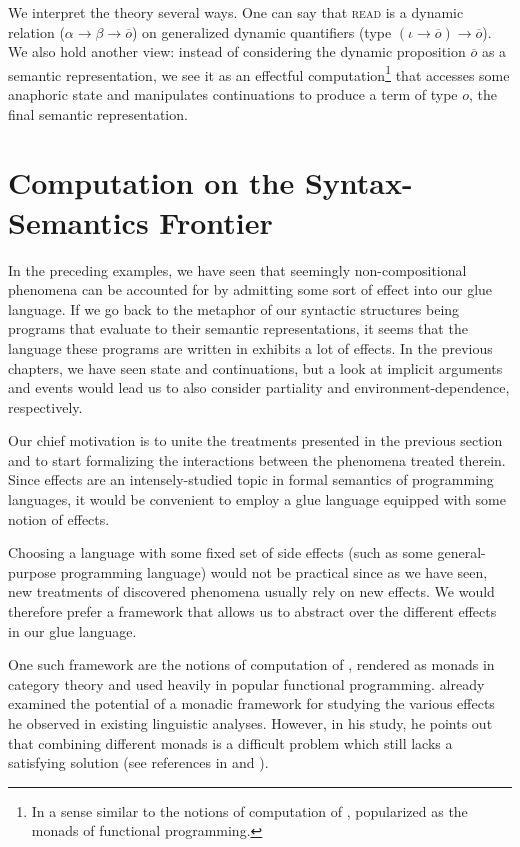 \documentclass{article}
\begin{document}
We interpret the theory several ways. One can say that \textsc{read} is a
dynamic relation ($\alpha \to \beta \to \overline{o}$) on generalized dynamic
quantifiers (type $(\iota \to \overline{o}) \to \overline{o}$). We also hold
another view: instead of considering the dynamic proposition $\overline{o}$ as
a semantic representation, we see it as an effectful computation\footnote{In a
  sense similar to the notions of computation of \citet{moggi1991notions},
  popularized as the monads of functional programming.} that accesses some
anaphoric state and manipulates continuations to produce a term of type $o$,
the final semantic representation.


\section{Computation on the Syntax-Semantics Frontier}

In the preceding examples, we have seen that seemingly non-compositional
phenomena can be accounted for by admitting some sort of effect into our glue
language. If we go back to the metaphor of our syntactic structures being
programs that evaluate to their semantic representations, it seems that the
language these programs are written in exhibits a lot of effects. In the
previous chapters, we have seen state and continuations, but a look at
implicit arguments and events would lead us to also consider partiality and
environment-dependence, respectively.

Our chief motivation is to unite the treatments presented in the previous
section and to start formalizing the interactions between the phenomena
treated therein. Since effects are an intensely-studied topic in formal
semantics of programming languages, it would be convenient to employ a glue
language equipped with some notion of effects.

Choosing a language with some fixed set of side effects (such as some
general-purpose programming language) would not be practical since as we have
seen, new treatments of discovered phenomena usually rely on new effects. We
would therefore prefer a framework that allows us to abstract over the
different effects in our glue language.

One such framework are the notions of computation of
\citet{moggi1991notions}, rendered as monads in category theory and used
heavily in popular functional programming. \citet{shan2002monads} already
examined the potential of a monadic framework for studying the various effects
he observed in existing linguistic analyses. However, in his study, he points
out that combining different monads is a difficult problem which still lacks a
satisfying solution (see references in \cite{shan2002monads} and
\citet{kammar2013handlers}).
\end{document}
